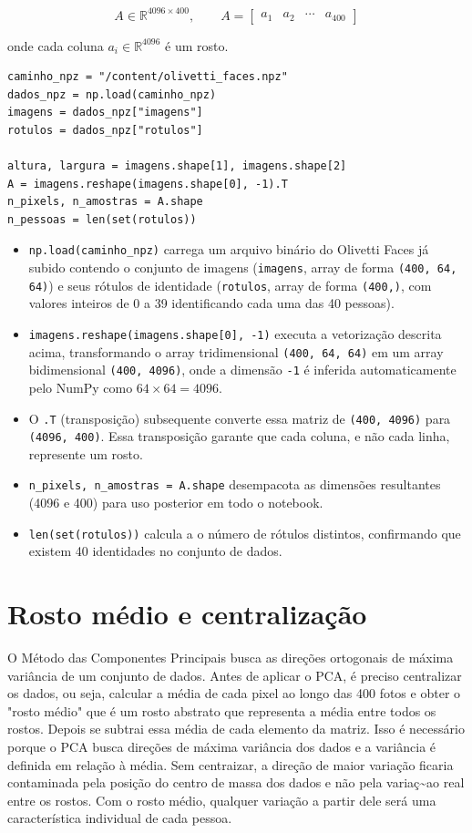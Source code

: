 \documentclass[12pt,a4paper]{article}
\begin{document}
$$A \in \mathbb{R}^{4096 \times 400}, \qquad A = \begin{bmatrix} a_1 & a_2 & \cdots & a_{400}\end{bmatrix}$$

onde cada coluna $a_i \in \mathbb{R}^{4096}$ é um rosto.

\begin{lstlisting}
caminho_npz = "/content/olivetti_faces.npz"
dados_npz = np.load(caminho_npz)
imagens = dados_npz["imagens"] 
rotulos = dados_npz["rotulos"] 

altura, largura = imagens.shape[1], imagens.shape[2]
A = imagens.reshape(imagens.shape[0], -1).T
n_pixels, n_amostras = A.shape
n_pessoas = len(set(rotulos))
\end{lstlisting}

\begin{itemize}
  \item \texttt{np.load(caminho\_npz)} carrega um arquivo binário do Olivetti Faces já subido contendo
  o conjunto de imagens (\texttt{imagens}, array de forma \texttt{(400, 64, 64)}) e seus rótulos de
  identidade (\texttt{rotulos}, array de forma \texttt{(400,)}, com valores inteiros de 0 a 39
  identificando cada uma das 40 pessoas).
  \item \texttt{imagens.reshape(imagens.shape[0], -1)} executa a vetorização descrita
  acima, transformando o array tridimensional \texttt{(400, 64, 64)} em um array bidimensional
  \texttt{(400, 4096)}, onde a dimensão \texttt{-1} é inferida automaticamente pelo NumPy como
  $64 \times 64 = 4096$.
  \item O \texttt{.T} (transposição) subsequente converte essa matriz de \texttt{(400, 4096)} para
  \texttt{(4096, 400)}. Essa transposição garante que cada coluna, e não cada
  linha, represente um rosto.
  \item \texttt{n\_pixels, n\_amostras = A.shape} desempacota as dimensões resultantes (4096 e 400) para uso posterior em todo o notebook.
  \item \texttt{len(set(rotulos))} calcula a o número de rótulos distintos,
  confirmando que existem 40 identidades no conjunto de dados.
\end{itemize}

\section{Rosto médio e centralização}

O Método das Componentes Principais busca as direções ortogonais de máxima variância
de um conjunto de dados. Antes de aplicar o PCA, é preciso centralizar os dados, ou seja, calcular a média de cada pixel ao longo das 400 fotos e obter o "rosto médio" que é um rosto abstrato que representa a média entre todos os rostos. Depois se subtrai essa média de cada elemento da matriz. Isso é necessário porque o PCA busca direções de máxima variância dos dados e a variância é definida em relação à média. Sem centraizar, a direção de maior variação ficaria contaminada pela posição do centro de massa dos dados e não pela variaç\textasciitilde ao real entre os rostos. Com o rosto médio, qualquer variação a partir dele será uma característica individual de cada pessoa.
\end{document}
